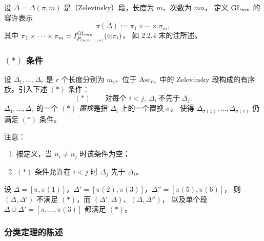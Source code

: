 \begin{definition}
设 $\Delta=\Delta(\pi,m)$ 是（Zelevinsky）段，长度为 $m$、次数为 $mn$，
定义 $\mathrm{GL}_{mn}$ 的容许表示
\[
\pi(\Delta):=\pi_1\times\cdots\times\pi_m,
\]
其中 $\pi_1\times\cdots\times\pi_m=I^{\mathrm{GL}_{mn}}_{P_{(n,n,\dots,n)}}(\otimes\pi_i)$，
如 2.2.4 末的注所述。
\end{definition}

\subsubsection{$(*)$ 条件}

设 $\Delta_1,\dots,\Delta_r$ 是 $r$ 个长度分别为 $m_i$、位于 $\mathrm{Asc}_{n_i}$ 中的
Zelevinsky 段构成的有序族。引入下述 $(*)$ 条件：
\[
(*) \qquad \text{对每个 } i<j,\ \Delta_i\ \text{不先于}\ \Delta_j .
\]
$\Delta_1,\dots,\Delta_r$ 的一个 \emph{$(*)$-置换}是指 $\Delta_i$ 上的一个置换 $\sigma$，
使得 $\Delta_{\sigma(1)},\dots,\Delta_{\sigma(r)}$ 仍满足 $(*)$ 条件。

注意：
\begin{enumerate}[label=(\arabic*),leftmargin=2.2em]
\item 按定义，当 $n_i\neq n_j$ 时该条件为空；
\item $(*)$ 条件允许在 $i<j$ 时 $\Delta_j$ 先于 $\Delta_i$。
\end{enumerate}

\begin{example}
设 $\Delta=[\pi,\pi(1)]$，$\Delta'=[\pi(2),\pi(3)]$，$\Delta''=[\pi(5),\pi(6)]$，
则 $(\Delta,\Delta')$ 不满足 $(*)$，而 $(\Delta',\Delta)$、$(\Delta,\Delta'')$，
以及单个段 $\Delta\cup\Delta'=[\pi,\dots,\pi(3)]$ 都满足 $(*)$。
\end{example}

\subsubsection{分类定理的陈述}


